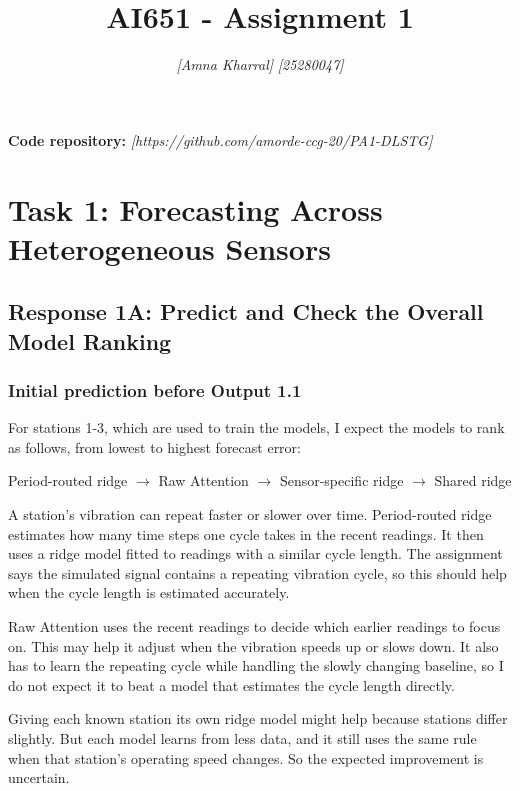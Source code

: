 \documentclass[11pt,a4paper]{article}
\title{AI651 - Assignment 1}
\author{\textit{[Amna Kharral]} \quad \textit{[25280047]}}
\date{}
\begin{document}
\maketitle

\textbf{Code repository:} \textit{[https://github.com/amorde-ccg-20/PA1-DLSTG]}

\section*{Task 1: Forecasting Across Heterogeneous Sensors}
\subsection*{Response 1A: Predict and Check the Overall Model Ranking}

\subsubsection*{Initial prediction before Output 1.1}


For stations 1-3, which are used to train the models, I expect the models to
rank as follows, from lowest to highest forecast error:
\begin{center}
Period-routed ridge $\rightarrow$ Raw Attention $\rightarrow$
Sensor-specific ridge $\rightarrow$ Shared ridge
\end{center}

A station's vibration can repeat faster or slower over time. Period-routed
ridge estimates how many time steps one cycle takes in the recent readings.
It then uses a ridge model fitted to readings with a similar cycle length.
The assignment says the simulated signal contains a repeating vibration
cycle, so this should help when the cycle length is estimated accurately.

Raw Attention uses the recent readings to decide which earlier readings to
focus on. This may help it adjust when the vibration speeds up or slows down.
It also has to learn the repeating cycle while handling the slowly changing
baseline, so I do not expect it to beat a model that estimates the cycle length
directly.

Giving each known station its own ridge model might help because stations
differ slightly. But each model learns from less data, and it still uses the
same rule when that station's operating speed changes. So the expected
improvement is uncertain.
\end{document}
